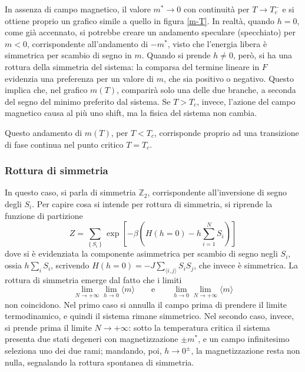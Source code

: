 \documentclass[11pt, a4paper]{scrartcl}
\theoremstyle{style}
\theoremstyle{style1}
\numberwithin{equation}{subsection}
\begin{document}
\begin{itemize}
\begin{center}
\begin{minipage}
			\end{minipage}
\end{center}
\end{itemize}
In assenza di campo magnetico, il valore $m^* \to 0$ con continuit\`a per $T\to T_c^-$ e si ottiene proprio un grafico simile a quello in figura \ref{m-T}.
In realt\`a, quando $h=0$, come gi\`a accennato, si potrebbe creare un andamento speculare (specchiato) per $m<0$, corrispondente all'andamento di $-m^*$, visto che l'energia libera \`e simmetrica per scambio di segno in $m$.
Quando si prende $h\neq 0$, per\`o, si ha una rottura della simmetria del sistema: la comparsa del termine lineare in $F$ evidenzia una preferenza per un valore di $m$, che sia positivo o negativo.
Questo implica che, nel grafico $m(T)$, comparir\`a solo una delle due branche, a seconda del segno del minimo preferito dal sistema.
Se $T>T_c$, invece, l'azione del campo magnetico causa al pi\`u uno shift, ma la fisica del sistema non cambia.

Questo andamento di $m(T)$, per $T<T_c$, corrisponde proprio ad una transizione di fase continua nel punto critico $T = T_c$.
\subsubsection{Rottura di simmetria}
In questo caso, si parla di simmetria $\mathbb{Z}_2$, corrispondente all'inversione di segno degli $S_i$.
Per capire cosa si intende per rottura di simmetria, si riprende la funzione di partizione
\[
Z = \sum_{\left\{ S_i \right\} }^{} \exp \left[ -\beta \left(H(h=0) - h \sum_{i=1}^{N} S_i\right)  \right] 
\] 
dove si \`e evidenziata la componente asimmetrica per scambio di segno negli $S_i$, ossia $h \sum_{i}^{} S_i$, scrivendo $H(h=0) = -J \sum_{\langle i,j \rangle}^{} S_iS_j$, che invece \`e simmetrica.
La rottura di simmetria emerge dal fatto che i limiti
\[
\lim_{N\to +\infty}\lim_{h\to 0}\langle m\rangle
\qquad\text{e}\qquad
\lim_{h\to 0}\lim_{N\to +\infty}\langle m\rangle
\]
non coincidono. Nel primo caso si annulla il campo prima di prendere il limite termodinamico, e quindi il sistema rimane simmetrico. Nel secondo caso, invece, si prende prima il limite $N\to +\infty$: sotto la temperatura critica il sistema presenta due stati degeneri con magnetizzazione $\pm m^*$, e un campo infinitesimo seleziona uno dei due rami; mandando, poi, $h\to 0^\pm$, la magnetizzazione resta non nulla, segnalando la rottura spontanea di simmetria.
\end{document}
